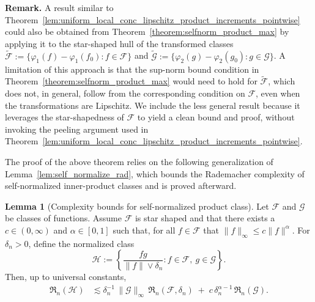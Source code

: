 \documentclass[11pt]{article}
\theoremstyle{plain}
\theoremstyle{definition} %
\newtheorem{lemma}{Lemma}
\begin{document}
\textbf{Remark.} A result similar to Theorem~\ref{lem:uniform_local_conc_lipschitz_product_increments_pointwise} could also be obtained from Theorem~\ref{theorem:selfnorm_product_max} by applying it to the star-shaped hull of the transformed classes
$\widetilde{\mathcal F}:=\{\varphi_1(f) - \varphi_1(f_0): f\in\mathcal F\}$ and
$\widetilde{\mathcal G}:=\{\varphi_2(g) - \varphi_2(g_0): g\in\mathcal G\}$.
A limitation of this approach is that the sup-norm bound condition in Theorem~\ref{theorem:selfnorm_product_max} would need to hold for $\widetilde{\mathcal F}$, which does not, in general, follow from the corresponding condition on $\mathcal F$, even when the transformations are Lipschitz. We include the less general result because it leverages the star-shapedness of $\mathcal F$ to yield a clean bound and proof, without invoking the peeling argument used in Theorem~\ref{lem:uniform_local_conc_lipschitz_product_increments_pointwise}.




The proof of the above theorem relies on the following generalization of
Lemma~\ref{lem:self_normalize_rad}, which bounds the Rademacher complexity of
self-normalized inner-product classes and is proved afterward. 



\begin{lemma}[Complexity bounds for self-normalized product class]
\label{lemma::selfnormproduct}
Let $\mathcal{F}$ and $\mathcal{G}$ be classes of functions. Assume $\mathcal{F}$ is star shaped and that there exists a $c \in (0,\infty)$ and $\alpha \in [0,1]$ such that, for all $f \in \mathcal{F}$ that $\|f\|_{\infty} \leq c \|f\|^{\alpha}$. For $\delta_n > 0$, define the normalized class
\[
\mathcal{H}
:=
\left\{\frac{fg}{\|f\|\vee \delta_n} : f\in\mathcal{F},\ g\in\mathcal{G}\right\}.
\]
Then, up to universal constants,
\begin{align*}
\mathfrak R_n(\mathcal H)
&\lesssim
\delta_n^{-1}\,\|\mathcal G\|_\infty\,\mathfrak R_n(\mathcal F,\delta_n)
\;+\;
c\,\delta_n^{\alpha-1}\,\mathfrak R_n(\mathcal G).
\end{align*}
\end{lemma}
\end{document}
